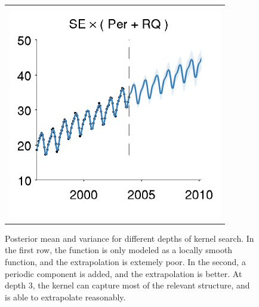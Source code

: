 \documentclass[twoside]{article}
\begin{document}
\begin{figure}[h!]
\begin{tabular}{c}
\hspace{-0.7cm} \includegraphics[width=\wmg,height=\hmg]{../figures/decomposition/11-Feb-v4-03-mauna2003-s_max_level_2/03-mauna2003-s_all_small}
\end{tabular}
\caption{Posterior mean and variance for different depths of kernel search.  In the first row, the function is only modeled as a locally smooth function, and the extrapolation is extemely poor.  In the second, a periodic component is added, and the extrapolation is better.  At depth 3, the kernel can capture most of the relevant structure, and is able to extrapolate reasonably. %
}
\label{fig:mauna_grow}
\end{figure}
\end{document}
